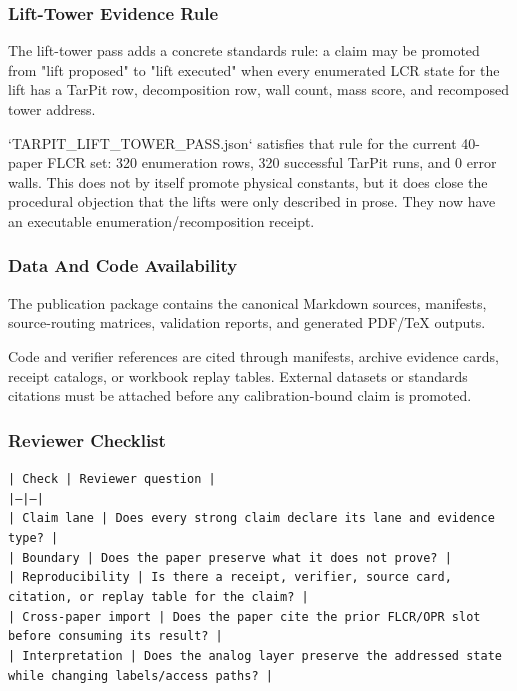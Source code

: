 \documentclass[11pt]{article}
\begin{document}
\subsubsection*{Lift-Tower Evidence Rule}

The lift-tower pass adds a concrete standards rule: a claim may be promoted from "lift proposed" to "lift executed" when every enumerated LCR state for the lift has a TarPit row, decomposition row, wall count, mass score, and recomposed tower address.

`TARPIT\_LIFT\_TOWER\_PASS.json` satisfies that rule for the current 40-paper FLCR set: 320 enumeration rows, 320 successful TarPit runs, and 0 error walls. This does not by itself promote physical constants, but it does close the procedural objection that the lifts were only described in prose. They now have an executable enumeration/recomposition receipt.

\subsubsection*{Data And Code Availability}

The publication package contains the canonical Markdown sources, manifests, source-routing matrices, validation reports, and generated PDF/TeX outputs.

Code and verifier references are cited through manifests, archive evidence cards, receipt catalogs, or workbook replay tables. External datasets or
standards citations must be attached before any calibration-bound claim is
promoted.

\subsubsection*{Reviewer Checklist}

\noindent\texttt{| Check | Reviewer question |}\\
\noindent\texttt{|---|---|}\\
\noindent\texttt{| Claim lane | Does every strong claim declare its lane and evidence type? |}\\
\noindent\texttt{| Boundary | Does the paper preserve what it does not prove? |}\\
\noindent\texttt{| Reproducibility | Is there a receipt, verifier, source card, citation, or replay table for the claim? |}\\
\noindent\texttt{| Cross-paper import | Does the paper cite the prior FLCR/OPR slot before consuming its result? |}\\
\noindent\texttt{| Interpretation | Does the analog layer preserve the addressed state while changing labels/access paths? |}\\
\end{document}
